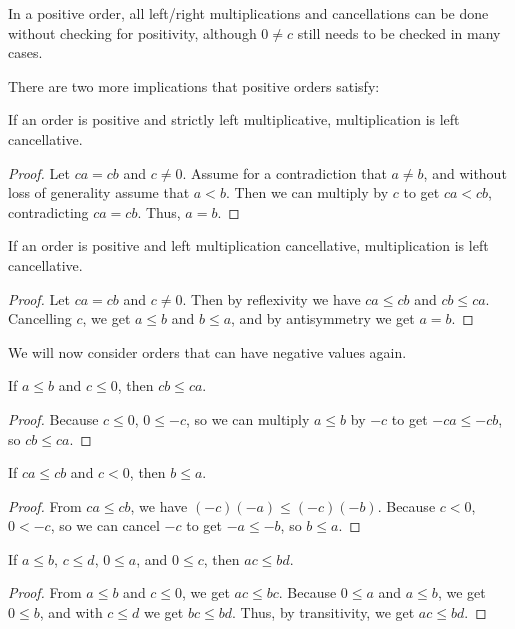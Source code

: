 \documentclass[../../math.tex]{subfiles}
\begin{document}
In a positive order, all left/right multiplications and cancellations can be
done without checking for positivity, although $0 \neq c$ still needs to be
checked in many cases.

There are two more implications that positive orders satisfy:

\begin{instance} \label{mult_lcancel1}
    If an order is positive and strictly left multiplicative, multiplication is
    left cancellative.
\end{instance}
\begin{proof}
    Let $ca = cb$ and $c \neq 0$.  Assume for a contradiction that $a \neq b$,
    and without loss of generality assume that $a < b$.  Then we can multiply by
    $c$ to get $ca < cb$, contradicting $ca = cb$.  Thus, $a = b$.
\end{proof}

\begin{instance} \label{mult_lcancel2}
    If an order is positive and left multiplication cancellative, multiplication
    is left cancellative.
\end{instance}
\begin{proof}
    Let $ca = cb$ and $c \neq 0$.  Then by reflexivity we have $ca \leq cb$ and
    $cb \leq ca$.  Cancelling $c$, we get $a \leq b$ and $b \leq a$, and by
    antisymmetry we get $a = b$.
\end{proof}

We will now consider orders that can have negative values again.

\begin{theorem} \label{le_lmult_neg}
    If $a \leq b$ and $c \leq 0$, then $cb \leq ca$.
\end{theorem}
\begin{proof}
    Because $c \leq 0$, $0 \leq -c$, so we can multiply $a \leq b$ by $-c$ to
    get $-ca \leq -cb$, so $cb \leq ca$.
\end{proof}

\begin{theorem} \label{le_mult_lcancel_neg}
    If $ca \leq cb$ and $c < 0$, then $b \leq a$.
\end{theorem}
\begin{proof}
    From $ca \leq cb$, we have $(-c)(-a) \leq (-c)(-b)$.  Because $c < 0$, $0 <
    -c$, so we can cancel $-c$ to get $-a \leq -b$, so $b \leq a$.
\end{proof}

\begin{theorem} \label{le_lrmult_pos}
    If $a \leq b$, $c \leq d$, $0 \leq a$, and $0 \leq c$, then $ac \leq bd$.
\end{theorem}
\begin{proof}
    From $a \leq b$ and $c \leq 0$, we get $ac \leq bc$.  Because $0 \leq a$ and
    $a \leq b$, we get $0 \leq b$, and with $c \leq d$ we get $bc \leq bd$.
    Thus, by transitivity, we get $ac \leq bd$.
\end{proof}
\end{document}
